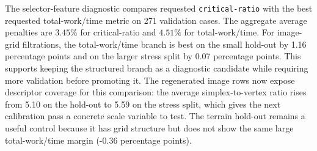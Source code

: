 The selector-feature diagnostic compares requested \texttt{critical-ratio} with the best requested total-work/time metric on 271 validation cases.  The aggregate average penalties are $3.45\%$ for critical-ratio and $4.51\%$ for total-work/time.
For image-grid filtrations, the total-work/time branch is best on the small hold-out by 1.16 percentage points and on the larger stress split by 0.07 percentage points.  This supports keeping the structured branch as a diagnostic candidate while requiring more validation before promoting it.
The regenerated image rows now expose descriptor coverage for this comparison: the average simplex-to-vertex ratio rises from 5.10 on the hold-out to 5.59 on the stress split, which gives the next calibration pass a concrete scale variable to test.
The terrain hold-out remains a useful control because it has grid structure but does not show the same large total-work/time margin (-0.36 percentage points).
